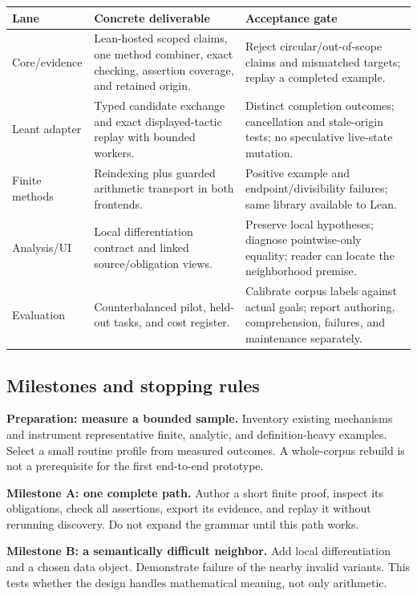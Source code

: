\documentclass[11pt,letterpaper]{article}
\begin{document}
\begin{tabularx}{\textwidth}{@{}P{.18\textwidth}YP{.27\textwidth}@{}}
\toprule
Lane & Concrete deliverable & Acceptance gate \\
\midrule
Core/evidence & Lean-hosted scoped claims, one method combiner, exact checking,
  assertion coverage, and retained origin. & Reject circular/out-of-scope claims
  and mismatched targets; replay a completed example.\\
Leant adapter & Typed candidate exchange and exact displayed-tactic replay with
  bounded workers. & Distinct completion outcomes; cancellation and stale-origin
  tests; no speculative live-state mutation.\\
Finite methods & Reindexing plus guarded arithmetic transport in both frontends.
  & Positive example and endpoint/divisibility failures; same library available
  to Lean.\\
Analysis/UI & Local differentiation contract and linked source/obligation views.
  & Preserve local hypotheses; diagnose pointwise-only equality; reader can
  locate the neighborhood premise.\\
Evaluation & Counterbalanced pilot, held-out tasks, and cost register.
  & Calibrate corpus labels against actual goals; report authoring, comprehension,
  failures, and maintenance separately.\\
\bottomrule
\end{tabularx}

\subsection{Milestones and stopping rules}
\textbf{Preparation: measure a bounded sample.} Inventory existing mechanisms
and instrument representative finite, analytic, and definition-heavy examples.
Select a small routine profile from measured outcomes. A whole-corpus rebuild is
not a prerequisite for the first end-to-end prototype.

\textbf{Milestone A: one complete path.} Author a short finite proof, inspect its
obligations, check all assertions, export its evidence, and replay it without
rerunning discovery. Do not expand the grammar until this path works.

\textbf{Milestone B: a semantically difficult neighbor.} Add local differentiation
and a chosen data object. Demonstrate failure of the nearby invalid variants.
This tests whether the design handles mathematical meaning, not only arithmetic.
\end{document}
